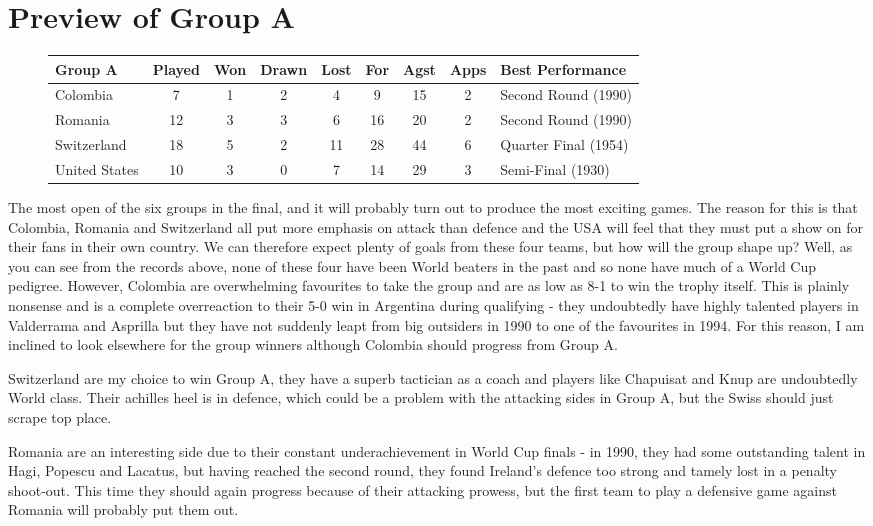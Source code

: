 \chapter{Preview of Group A}
\newline
\newline
\begin{figure}[H]
\small
\begin{tabular}{l c c c c c c c l}
Group A & Played & Won & Drawn & Lost & For & Agst & Apps & Best Performance\\ \hline
Colombia & 7 & 1 & 2 & 4 & 9 & 15 & 2 & Second Round (1990) \\
Romania & 12 & 3 & 3 & 6 & 16 & 20 & 2 & Second Round (1990)\\
Switzerland & 18 & 5 & 2 & 11 & 28 & 44 & 6 & Quarter Final (1954)\\
United States & 10 & 3 & 0 & 7 & 14 & 29 & 3 & Semi-Final (1930) \\ \hline
\end{tabular}
\normalsize
\end{figure}
The most open of the six groups in the final, and it will probably turn out to
produce the most exciting games. The reason for this is that Colombia, Romania 
and Switzerland all put more emphasis on attack than defence and the USA will
feel that they must put a show on for their fans in their own country. We can
therefore expect plenty of goals from these four teams, but how will the group
shape up? Well, as you can see from the records above, none of these four have
been World beaters in the past and so none have much of a World Cup pedigree. 
However, Colombia are overwhelming favourites to take the group and are as low
as 8-1 to win the trophy itself. This is plainly nonsense and is a complete
overreaction to their 5-0 win in Argentina during qualifying - they undoubtedly
have highly talented players in Valderrama and Asprilla but they have not
suddenly leapt from big outsiders in 1990 to one of the favourites in 1994. For
this reason, I am inclined to look elsewhere for the group winners although
Colombia should progress from Group A.

Switzerland are my choice to win Group A, they have a superb tactician as a 
coach and players like Chapuisat and Knup are undoubtedly World class. Their 
achilles heel is in defence, which could be a problem with the attacking sides
in Group A, but the Swiss should just scrape top place.

Romania are an interesting side due to their constant underachievement in World
Cup finals - in 1990, they had some outstanding talent in Hagi, Popescu and 
Lacatus, but having reached the second round, they found Ireland's defence too
strong and tamely lost in a penalty shoot-out. This time they should again 
progress because of their attacking prowess, but the first team to play a 
defensive game against Romania will probably put them out.

